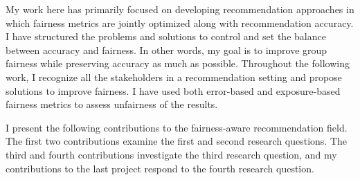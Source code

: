 My work here has primarily focused on developing recommendation approaches in which fairness metrics are jointly optimized along with recommendation accuracy. I have structured the problems and solutions to control and set the balance between accuracy and fairness. In other words, my goal is to improve group fairness while preserving accuracy as much as possible. Throughout the following work, I recognize all the stakeholders in a recommendation setting and propose solutions to improve fairness. I have used both error-based and exposure-based fairness metrics to assess unfairness of the results. 

I present the following contributions to the fairness-aware recommendation field. The first two contributions examine the first and second research questions. The third and fourth contributions investigate the third research question, and my contributions to the last project respond to the fourth research question.

